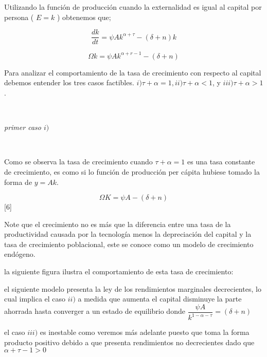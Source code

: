 \documentclass[12pt]{article}
\begin{document}
Utilizando la función de producción cuando la externalidad es igual al capital por persona ( $E=k$ ) obtenemos que; 

$$
\dfrac{dk}{dt}= \psi Ak^{\alpha + \tau}-(\delta + n ) k$$



$$\Omega k= \psi A k^{\alpha+r-1}-(\delta + n)$$

Para analizar el comportamiento de la tasa de crecimiento con respecto al capital debemos entender los tres casos factibles. $i) \tau + \alpha =1, ii) \tau + \alpha < 1 $, y $iii) \tau + \alpha > 1$.

\
\
       
\textit{primer caso $i)$}

\


Como se observa la tasa de crecimiento cuando $\tau + \alpha =1$ es  una tasa constante de crecimiento, es como si lo función de producción per cápita hubiese tomado la forma de $y=Ak$.

$$\Omega K = \psi A - (\delta + n)$$ [6]




Note que el crecimiento no es más que la diferencia entre una tasa de la productividad causada por la tecnología menos la depreciación del capital y la tasa de crecimiento poblacional, este se conoce como un modelo de crecimiento endógeno.


la siguiente figura ilustra el comportamiento de esta tasa de crecimiento:



el siguiente modelo presenta la ley de los rendimientos marginales decrecientes, lo cual implica el caso $ii)$ a medida que aumenta el capital disminuye la parte ahorrada hasta converger a un estado de equilibrio donde 
$\dfrac{\psi A}{k^{1 - \alpha - \tau}}=(\delta + n)$







el caso $iii)$ es inestable como veremos más adelante puesto que toma la forma producto positivo debido  a que presenta rendimientos no decrecientes dado que $\alpha + \tau  -1 > 0$






\definecolor{wwwwww}{rgb}{0.4,0.4,0.4}
\end{document}
